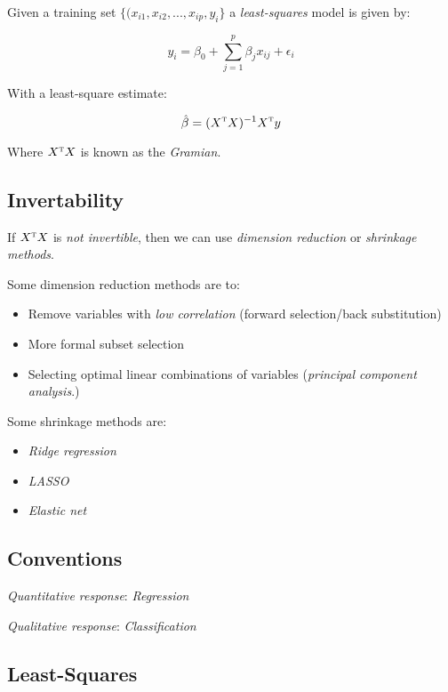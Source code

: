 \documentclass[twoside,twocolumn,10pt]{revtex4-1}
\begin{document}
	Given a training set $\lbrace (x_ {i1}, x_{i2}, ..., x_{ip}, y_i \rbrace$ a \textit{least-squares} model is given by:
	
	\begin{equation*}
	y_i = \beta_0 + \sum_{j=1}^p \beta_j x_{ij} + \epsilon_i
	\end{equation*}
	
	With a least-square estimate:
	
	\begin{equation*}
	\hat{\beta} = (X^\textsc{t} X)^{-1} X^\textsc{t} y
	\end{equation*}	
	
	Where $X^\textsc{t}X$ is known as the \textit{Gramian}.
	
	\subsection{Invertability}
	
	If $X^\textsc{t} X$ is \textit{not invertible}, then we can use \textit{dimension reduction} or \textit{shrinkage methods}.
	
	Some dimension reduction methods are to:
	
	\begin{itemize}
	\item Remove variables with \textit{low correlation} (forward selection/back substitution)
	\item More formal subset selection
	\item Selecting optimal linear combinations of variables (\textit{principal component analysis}.)
	\end{itemize}

	Some shrinkage methods are:
	
	\begin{itemize}
	\item \textit{Ridge regression}
	\item \textit{LASSO}
	\item \textit{Elastic net}
	\end{itemize}
	
	\subsection{Conventions}
	
	\textit{Quantitative response}: \textit{Regression}
	
	\textit{Qualitative response}: \textit{Classification}
	
	\subsection{Least-Squares}
	
\end{document}
